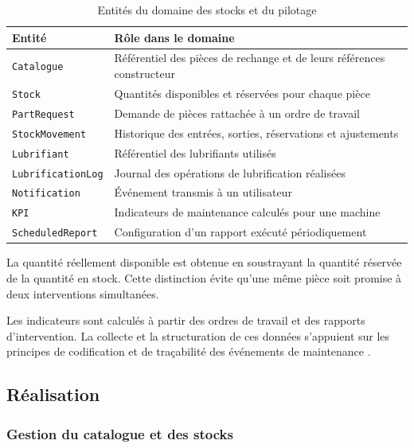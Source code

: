 \begin{table}[H]
\centering
\caption{Entités du domaine des stocks et du pilotage}
\label{tab:modele-stocks}
\footnotesize
\setlength{\tabcolsep}{4pt}
\begin{tabularx}{\textwidth}{|>{\raggedright\arraybackslash}p{3.2cm}|>{\raggedright\arraybackslash}X|}
\hline
\textbf{Entité} & \textbf{Rôle dans le domaine} \\
\hline
\texttt{Catalogue} & Référentiel des pièces de rechange et de leurs références constructeur \\
\hline
\texttt{Stock} & Quantités disponibles et réservées pour chaque pièce \\
\hline
\texttt{PartRequest} & Demande de pièces rattachée à un ordre de travail \\
\hline
\texttt{StockMovement} & Historique des entrées, sorties, réservations et ajustements \\
\hline
\texttt{Lubrifiant} & Référentiel des lubrifiants utilisés \\
\hline
\texttt{LubrificationLog} & Journal des opérations de lubrification réalisées \\
\hline
\texttt{Notification} & Événement transmis à un utilisateur \\
\hline
\texttt{KPI} & Indicateurs de maintenance calculés pour une machine \\
\hline
\texttt{ScheduledReport} & Configuration d'un rapport exécuté périodiquement \\
\hline
\end{tabularx}
\end{table}

La quantité réellement disponible est obtenue en soustrayant la quantité réservée de la quantité en stock. Cette distinction évite qu'une même pièce soit promise à deux interventions simultanées.

Les indicateurs sont calculés à partir des ordres de travail et des rapports d'intervention. La collecte et la structuration de ces données s'appuient sur les principes de codification et de traçabilité des événements de maintenance \cite{iso14224}.
\subsection{Réalisation}

\subsubsection{Gestion du catalogue et des stocks}


